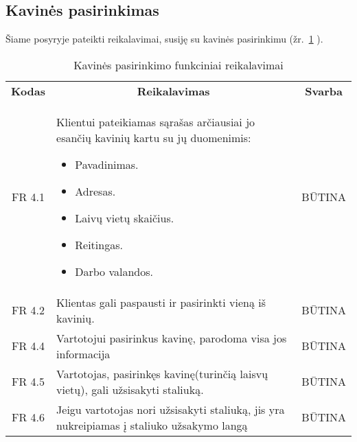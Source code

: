 \documentclass{VUMIFPSkursinis}
\begin{document}
\subsection{Kavinės pasirinkimas}

Šiame posyryje pateikti reikalavimai, susiję su kavinės pasirinkimu (žr.~\ref{table:KavinėsPasirinkimas} ).

\begin{center}
	\begin{table}[H]
	\begin{tabular}{|p{2cm}|p{}|p{}|}
	
	\hline
	    \rowcolor{lightgray}
		\multicolumn{3}{|c|}{Kavinės pasirinkimas}\\
		
	\hline
		\multicolumn{1}{|c|}{{\bfseries Kodas}}&
		\multicolumn{1}{|c|}{{\bfseries Reikalavimas}}&
		\multicolumn{1}{|c|}{{\bfseries Svarba}}\\

	\hline
	
		\multicolumn{1}{|c|}{FR 4.1}&
		{Klientui pateikiamas sąrašas arčiausiai jo esančių kavinių kartu su jų duomenimis:
		\begin{itemize}
			\item Pavadinimas.
			\item Adresas.
			\item Laivų vietų skaičius.
			\item Reitingas.
			\item Darbo valandos.
		\end{itemize}}&
		\multicolumn{1}{|c|}{BŪTINA}\\	
		
	\hline
	
		\multicolumn{1}{|c|}{FR 4.2}&
		{Klientas gali paspausti ir pasirinkti vieną iš kavinių.}&
		\multicolumn{1}{|c|}{BŪTINA}\\
		
	\hline
	
		\multicolumn{1}{|c|}{FR 4.4}&
		{Vartotojui pasirinkus kavinę, parodoma visa jos informacija}&
		\multicolumn{1}{|c|}{BŪTINA}\\
		
	\hline
	
		\multicolumn{1}{|c|}{FR 4.5}&
		{Vartotojas, pasirinkęs kavinę(turinčią laisvų vietų), gali užsisakyti staliuką.}&
		\multicolumn{1}{|c|}{BŪTINA}\\
	\hline
	
		\multicolumn{1}{|c|}{FR 4.6}&
		{Jeigu vartotojas nori užsisakyti staliuką, jis yra nukreipiamas į staliuko užsakymo langą}&
		\multicolumn{1}{|c|}{BŪTINA}\\				
	\hline
	
	\end{tabular}		
	\caption{Kavinės pasirinkimo funkciniai reikalavimai}
	\label{table:KavinėsPasirinkimas}
	\end{table}


\end{center}
\end{document}
